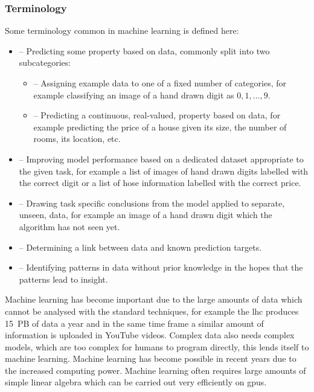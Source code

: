\documentclass[a4paper]{article}
\begin{document}
    \subsubsection{Terminology}
    Some terminology common in machine learning is defined here:
    \begin{itemize}
        \item {} -- Predicting some property based on data, commonly split into two subcategories:
        \begin{itemize}
            \item {} -- Assigning example data to one of a fixed number of categories, for example classifying an image of a hand drawn digit as \(0, 1, \dotsc, 9\).
            \item {} -- Predicting a continuous, real-valued, property based on data, for example predicting the price of a house given its size, the number of rooms, its location, etc.
        \end{itemize}
        \item {} -- Improving model performance based on a dedicated dataset appropriate to the given task, for example a list of images of hand drawn digits labelled with the correct digit or a list of hose information labelled with the correct price.
        \item {} -- Drawing task specific conclusions from the model applied to separate, unseen, data, for example an image of a hand drawn digit which the algorithm has not seen yet.
        \item {} -- Determining a link between data and known prediction targets.
        \item {} -- Identifying patterns in data without prior knowledge in the hopes that the patterns lead to insight.
    \end{itemize}
    
    Machine learning has become important due to the large amounts of data which cannot be analysed with the standard techniques, for example the \gls{lhc} produces \SI{15}{\peta B} of data a year and in the same time frame a similar amount of information is uploaded in YouTube videos.
    Complex data also needs complex models, which are too complex for humans to program directly, this lends itself to machine learning.
    Machine learning has become possible in recent years due to the increased computing power.
    Machine learning often requires large amounts of simple linear algebra which can be carried out very efficiently on \glspl{gpu}.
    
\end{document}
